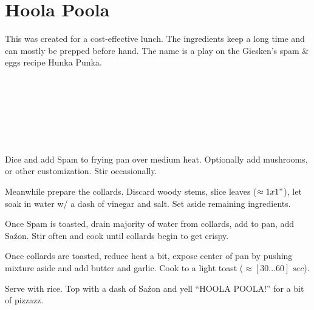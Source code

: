 \section{Hoola Poola}
\begin{recipestats}[
	servings=1 person,
	preptime=10 minutes,
	bakingtime=20 minutes,
	]
\end{recipestats}

\begin{recipeabstract}
	This was created for a cost-effective lunch.
	The ingredients keep a long time and can mostly be prepped before hand.
	The name is a play on the Giesken's spam \& eggs recipe Hunka Punka. %
\end{recipeabstract}

\begin{ingredientcolumns}
	\begin{ingredientblock}
		\\
		\\
		\\
	\end{ingredientblock}
	\begin{ingredientblock}
		\ingredient[\approx \onehalf][\teaspoon]{Sa\'zon}\\
		\ingredient[1][\Tablespoon]{butter}\\
		\ingredient[\onehalf][\Tablespoon]{garlic, minced}
	\end{ingredientblock}
\end{ingredientcolumns}


\begin{preparation}
\item Dice and add Spam to frying pan over medium heat. Optionally add mushrooms, or other customization. Stir occasionally.

\item Meanwhile prepare the collards. Discard woody stems, slice leaves ($\approx1x1"$), let soak in water w/ a dash of vinegar and salt. Set aside remaining ingredients.

\item Once Spam is toasted, drain majority of water from collards, add to pan, add Sa\'zon. Stir often and cook until collards begin to get crispy.

\item Once collards are toasted, reduce heat a bit, expose center of pan by pushing mixture aside and add butter and garlic. Cook to a light toast ($\approx[30\dots 60]\; sec$).

\item Serve with rice. Top with a dash of Sa\'zon and yell ``HOOLA POOLA!'' for a bit of pizzazz.
\end{preparation}

\recipeend
